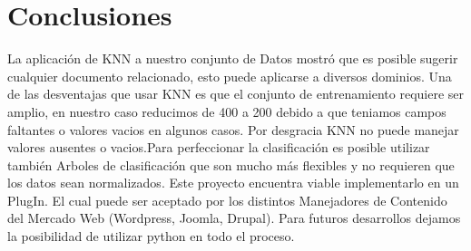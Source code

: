 \section{Conclusiones}
La aplicación de KNN a nuestro conjunto de Datos mostró que es posible sugerir cualquier documento relacionado, esto puede aplicarse a diversos dominios. Una de las desventajas que usar KNN es que el conjunto de entrenamiento requiere ser amplio, en nuestro caso reducimos de 400 a 200 debido a que teniamos campos faltantes o valores vacios en algunos casos. Por desgracia KNN no puede manejar valores ausentes o vacios.Para perfeccionar la clasificación es posible utilizar también Arboles de clasificación que son mucho más flexibles y no requieren que los datos sean normalizados. Este proyecto encuentra viable implementarlo en un PlugIn. El cual puede ser aceptado por los distintos Manejadores de Contenido del Mercado Web (Wordpress, Joomla, Drupal).  Para futuros desarrollos dejamos la posibilidad de utilizar python en todo el proceso. 



